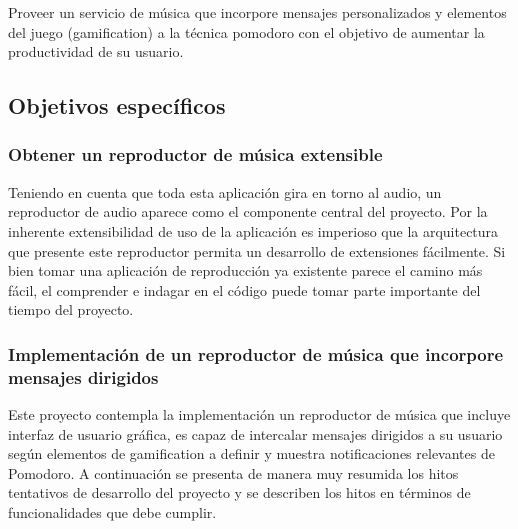\documentclass[12pt,letterpaper]{report}
\begin{document}
Proveer un servicio de música que incorpore mensajes personalizados y
elementos del juego (gamification) a la técnica pomodoro con el objetivo
de aumentar la productividad de su usuario.

\hypertarget{objetivos-especuxedficos}{%
\subsection{Objetivos específicos}\label{objetivos-especuxedficos}}

\hypertarget{obtener-un-reproductor-de-muxfasica-extensible}{%
\subsubsection{Obtener un reproductor de música
extensible}\label{obtener-un-reproductor-de-muxfasica-extensible}}

Teniendo en cuenta que toda esta aplicación gira en torno al audio, un
reproductor de audio aparece como el componente central del proyecto.
Por la inherente extensibilidad de uso de la aplicación es imperioso que
la arquitectura que presente este reproductor permita un desarrollo de
extensiones fácilmente. Si bien tomar una aplicación de reproducción ya
existente parece el camino más fácil, el comprender e indagar en el
código puede tomar parte importante del tiempo del proyecto.

\hypertarget{implementaciuxf3n-de-un-reproductor-de-muxfasica-que-incorpore-mensajes-dirigidos}{%
\subsubsection{Implementación de un reproductor de música que incorpore
mensajes
dirigidos}\label{implementaciuxf3n-de-un-reproductor-de-muxfasica-que-incorpore-mensajes-dirigidos}}

Este proyecto contempla la implementación un reproductor de música que
incluye interfaz de usuario gráfica, es capaz de intercalar mensajes
dirigidos a su usuario según elementos de gamification a definir y
muestra notificaciones relevantes de Pomodoro. A continuación se
presenta de manera muy resumida los hitos tentativos de desarrollo del
proyecto y se describen los hitos en términos de funcionalidades que
debe cumplir.
\end{document}
